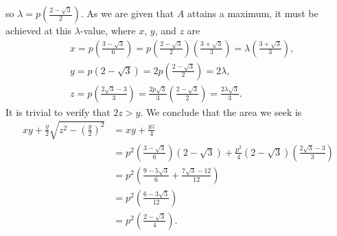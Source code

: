 \documentclass[11pt]{article}
\begin{document}
so $\lambda = p \left( \frac{2 - \sqrt{3}}{2} \right)$. As we are given that $A$ attains a maximum, it must be achieved at this $\lambda$-value, where $x$, $y$, and $z$ are
\begin{align*}
	& \boxed{x = p \left( \frac{3 - \sqrt{3}}{6} \right)} = p \left( \frac{2 - \sqrt{3}}{2} \right) \left( \frac{3 + \sqrt{3}}{3} \right) = \lambda \left( \frac{3 + \sqrt{3}}{3} \right), \\
	& \boxed{y = p(2 - \sqrt{3})} = 2 p \left( \frac{2 - \sqrt{3}}{2} \right) = 2\lambda, \\
	& \boxed{z = p \left( \frac{2\sqrt{3} - 3}{3} \right)} = \frac{2p \sqrt{3}}{3} \left( \frac{2 - \sqrt{3}}{2} \right)= \frac{2\lambda \sqrt{3}}{3}.
\end{align*}
It is trivial to verify that $2z > y$. We conclude that the area we seek is
\begin{align*}
	xy + \frac{y}{2} \sqrt{z^{2} - \left(\tfrac{y}{2}\right)^{2}} &= xy + \frac{yz}{4} \\
	&= p^{2} \left( \frac{3 - \sqrt{3}}{6} \right) \left( 2 - \sqrt{3} \right) + \frac{p^{2}}{4} \left( 2 - \sqrt{3} \right) \left( \frac{2 \sqrt{3} - 3}{3} \right) \\
	&= p^{2} \left( \frac{9 - 5\sqrt{3}}{6} + \frac{7 \sqrt{3} - 12}{12} \right) \\
	&= p^{2} \left( \frac{6 - 3 \sqrt{3}}{12} \right) \\
	&= \boxed{p^{2} \left( \frac{2 - \sqrt{3}}{4} \right)}.
\end{align*}

\end{document}

